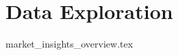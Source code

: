 
\section{Data Exploration}
\label{section:Architecture:DataExploration}
{market_insights_overview.tex}